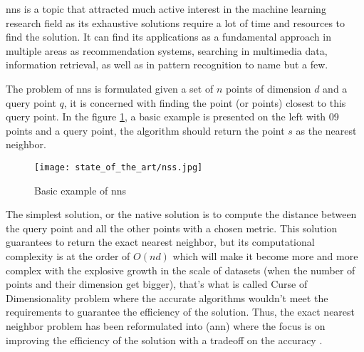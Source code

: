 \Acrfull{nns} is a topic that attracted much active interest in the machine
learning research field as its exhaustive solutions require a lot of time and
resources to find the solution. It can find its applications as a fundamental
approach in multiple areas as recommendation systems, searching in multimedia
data, information retrieval, as well as in pattern recognition to name but a
few.

The problem of \Acrlong{nns} is formulated given a set of $n$ points of
dimension $d$ and a \gls{query} point $q$, it is concerned with finding the
point (or points) closest to this query point. In the figure
\ref{fig:nss_problem}, a basic example is presented on the left with 09 points
and a query point, the algorithm should return the point $s$ as the nearest
neighbor.
\begin{figure}[h]
    \centering
    \texttt{[image: state\_of\_the\_art/nss.jpg]}
    \caption{Basic example of \Acrlong{nns}}
    \label{fig:nss_problem}
\end{figure}

The simplest solution, or the native solution is to compute the distance between
the query point and all the other points with a chosen metric. This solution
guarantees to return the exact nearest neighbor, but its computational
complexity is at the order of $O(nd)$ which will make it become more and more
complex with the explosive growth in the scale of datasets (when the number of points
and their dimension get bigger), that's what is called Curse of Dimensionality
problem where the accurate algorithms wouldn't meet the requirements to
guarantee the efficiency of the solution. Thus, the exact nearest neighbor
problem has been reformulated into (\Acrlong{ann}) where the focus is on
improving the efficiency of the solution with a tradeoff on the accuracy
\citep{fast_ann_hajebi_2011}.